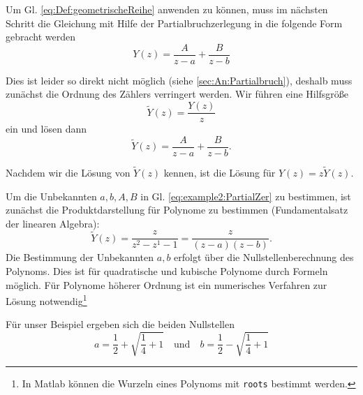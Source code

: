 Um Gl. \ref{eq:Def:geometrischeReihe} anwenden zu können, muss im
nächsten Schritt die Gleichung mit Hilfe der
Partialbruchzerlegung in die folgende Form gebracht werden
\begin{equation}\label{eq:example2:zLoesung2}
Y(z) = \frac{A}{z-a} + \frac{B}{z-b}
\end{equation}

Dies ist leider so direkt nicht möglich (siehe
\ref{sec:An:Partialbruch}), deshalb muss zunächst die Ordnung des
Zählers verringert werden. Wir führen eine Hilfsgröße
\begin{equation}\label{eq:example2:yhilf}
\widetilde{Y}(z) = \frac{Y(z)}{z}
\end{equation}
ein und lösen dann
\begin{equation}\label{eq:example2:PartialZer}
\widetilde{Y}(z) = \frac{A}{z-a} + \frac{B}{z-b}.
\end{equation}

Nachdem wir
die Lösung von $\widetilde{Y}(z)$ kennen, ist die Lösung für $Y(z)
= z \widetilde{Y}(z)$.

Um die Unbekannten $a,b,A,B$ in Gl. \ref{eq:example2:PartialZer}
zu bestimmen, ist zunächst die Produktdarstellung für Polynome zu
bestimmen (Fundamentalsatz der linearen Algebra):
\begin{equation}\label{eq:example2:Produktloesung}
\widetilde{Y}(z) = \frac{z}{z^{2} - z^{1} -1}
=\frac{z}{(z-a)(z-b)}.
\end{equation}
Die Bestimmung der Unbekannten $a,b$ erfolgt über die
Nullstellenberechnung des Polynoms. Dies ist für quadratische und
kubische Polynome durch Formeln möglich. Für Polynome höherer
Ordnung ist ein numerisches Verfahren zur Lösung
notwendig\footnote{In Matlab können die Wurzeln eines Polynoms mit
	{\tt roots} bestimmt werden.}

Für unser Beispiel ergeben sich die beiden Nullstellen
\begin{equation}\label{eq:example2:LoesungNullstellen}
a = \frac{1}{2}+\sqrt{\frac{1}{4}+1} \quad \mbox{und} \quad b = \frac{1}{2}-\sqrt{\frac{1}{4}+1}
\end{equation}

